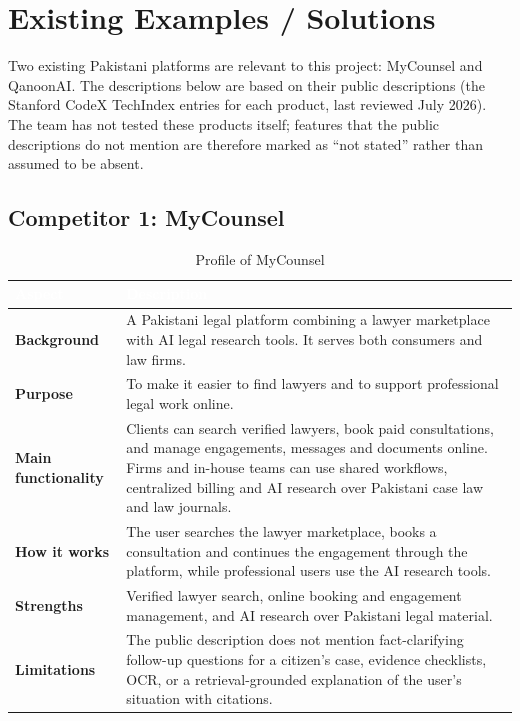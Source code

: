 \documentclass[12pt,a4paper]{report}
\newcommand{\thd}[1]{\textcolor{white}{\textbf{#1}}}
\newcommand{\headrow}{\rowcolor{tablehead}}
\begin{document}
\section{Existing Examples / Solutions}
Two existing Pakistani platforms are relevant to this project: MyCounsel and QanoonAI. The descriptions below are based on their public descriptions (the Stanford CodeX TechIndex entries for each product, last reviewed July 2026). The team has not tested these products itself; features that the public descriptions do not mention are therefore marked as ``not stated'' rather than assumed to be absent.

\subsection*{Competitor 1: MyCounsel}
\begin{table}[H]
\centering
\caption{Profile of MyCounsel}
\label{tab:mycounsel}
\begin{tabular}{|L{3.4cm}|L{10.6cm}|}
\hline
\headrow \thd{Aspect} & \thd{Description} \\ \hline
\textbf{Background} & A Pakistani legal platform combining a lawyer marketplace with AI legal research tools. It serves both consumers and law firms. \\ \hline
{}\textbf{Purpose} & To make it easier to find lawyers and to support professional legal work online. \\ \hline
\textbf{Main functionality} & Clients can search verified lawyers, book paid consultations, and manage engagements, messages and documents online. Firms and in-house teams can use shared workflows, centralized billing and AI research over Pakistani case law and law journals. \\ \hline
{}\textbf{How it works} & The user searches the lawyer marketplace, books a consultation and continues the engagement through the platform, while professional users use the AI research tools. \\ \hline
\textbf{Strengths} & Verified lawyer search, online booking and engagement management, and AI research over Pakistani legal material. \\ \hline
{}\textbf{Limitations} & The public description does not mention fact-clarifying follow-up questions for a citizen's case, evidence checklists, OCR, or a retrieval-grounded explanation of the user's situation with citations. \\ \hline
\end{tabular}
\end{table}
\end{document}
